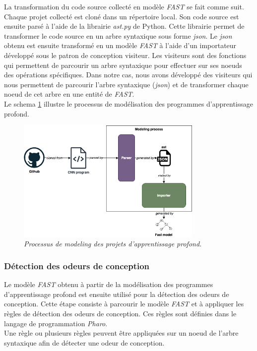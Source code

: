 La transformation du code source collecté en modèle \emph{FAST} se fait comme suit.
Chaque projet collecté est cloné dans un répertoire local. Son code source est
ensuite parsé à l'aide de la librairie \emph{ast.py} de Python. Cette librairie
permet de transformer le code source en un arbre syntaxique sous forme \emph{json}. Le
\emph{json} obtenu est ensuite transformé en un modèle \emph{FAST} à l'aide d'un importateur
développé sous le patron de conception visiteur. Les visiteurs sont des fonctions
qui permettent de parcourir un arbre syntaxique pour effectuer sur ses noeuds des opérations
spécifiques. Dans notre cas, nous avons développé des visiteurs qui
nous permettent de parcourir l'arbre syntaxique (\emph{json}) et de transformer chaque
noeud de cet arbre en une entité de \emph{FAST}.\\

Le schema \ref{fig:modelling} illustre le processus de modélisation des
programmes d'apprentissage profond.\\

\begin{figure}[h]
  \centering
  \includegraphics[width=0.8\textwidth]{figure/design_smell_modeling.png}
  \caption{\emph{Processus de modeling des projets d'apprentissage profond.}}
  \label{fig:modelling}
\end{figure}


\subsubsection{Détection des odeurs de conception}
\label{sec:Detection des odeurs de conception}
Le modèle \emph{FAST} obtenu à partir de la modélisation des programmes
d'apprentissage profond est ensuite utilisé pour la détection des odeurs de
conception. Cette étape consiste à parcourir le modèle \emph{FAST} et à appliquer les
règles de détection des odeurs de conception. Ces règles sont définies
dans le langage de programmation \emph{Pharo}.\\ Une règle ou plusieurs règles
peuvent être appliquées sur un noeud de l'arbre syntaxique afin de détecter une
odeur de conception.\\

